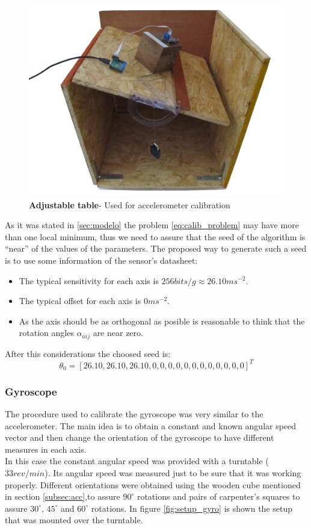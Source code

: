 \documentclass[conference]{IEEEtran}
\begin{document}
\begin{figure}
	\centering
	\includegraphics[width=.6\columnwidth]{./pics_paper/mesa.jpg}
	\caption{\textbf{Adjustable table}- Used for accelerometer calibration}
	\label{fig:mesa}
\end{figure}

As it was stated in \ref{sec:modelo} the problem \ref{eq:calib_problem} may have more than one local minimum, thus we need to assure that the seed of the algorithm is ``near'' of the values of the parameters. The proposed way to generate such a seed is to use some information of the sensor's datasheet\cite{bib:acc_data}: 

\begin{itemize}
\item The typical sensitivity for each axis is $256 bits/g \approx 26.10 ms^{-2}$.
\item The typical offset for each axis is $0 ms^{-2}$.
\item As the axis should be as orthogonal as posible is reasonable to think that the rotation angles $\alpha_{aij}$ are near zero. 
\end{itemize}

After this considerations the choosed seed is:
\begin{equation}
{\theta}_0 = [26.10, 26.10, 26.10, 0, 0, 0, 0, 0, 0, 0, 0, 0, 0, 0, 0]^T
\end{equation}
\subsubsection{Gyroscope}

The procedure used to calibrate the gyroscope was very similar to the accelerometer. The main idea is to obtain a constant and known angular speed vector and then change the orientation of the gyroscope to have different measures in each axis.\\

In this case the constant angular speed was provided with a turntable ($33 rev/min$). Its angular speed was measured just to be sure that it was working properly. Different orientations were obtained using the wooden cube mentioned in section \ref{subsec:acc},to assure $90^\circ$ rotations and pairs of carpenter's squares to assure $30^\circ$, $45^\circ$ and $60^\circ$ rotations. In figure \ref{fig:setup_gyro} is shown the setup that was mounted over the turntable.\\
\end{document}
